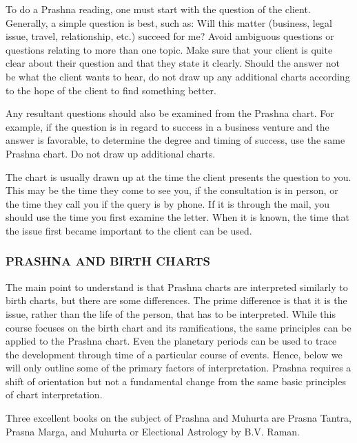 To do a Prashna reading, one must start with the question of the client. Generally, a simple question is best, such as: Will this matter (business, legal issue, travel, relationship, etc.) succeed for me? Avoid ambiguous questions or questions relating to more than one topic. Make sure that your client is quite clear about their question and that they state it clearly. Should the answer not be what the client wants to hear, do not draw up any additional charts according to the hope of the client to find something better.

 

Any resultant questions should also be examined from the Prashna chart. For example, if the question is in regard to success in a business venture and the answer is favorable, to determine the degree and timing of success, use the same Prashna chart. Do not draw up additional charts.

 

The chart is usually drawn up at the time the client presents the question to you. This may be the time they come to see you, if the consultation is in person, or the time they call you if the query is by phone. If it is through the mail, you should use the time you first examine the letter. When it is known, the time that the issue first became important to the client can be used.

 

\subsubsection{PRASHNA AND BIRTH CHARTS}

 

The main point to understand is that Prashna charts are interpreted similarly to birth charts, but there are some differences. The prime difference is that it is the issue, rather than the life of the person, that has to be interpreted. While this course focuses on the birth chart and its ramifications, the same principles can be applied to the Prashna chart. Even the planetary periods can be used to trace the development through time of a particular course of events. Hence, below we will only outline some of the primary factors of interpretation. Prashna requires a shift of orientation but not a fundamental change from the same basic principles of chart interpretation.

 

Three excellent books on the subject of Prashna and Muhurta are Prasna Tantra, Prasna Marga, and Muhurta or Electional Astrology by B.V. Raman.

